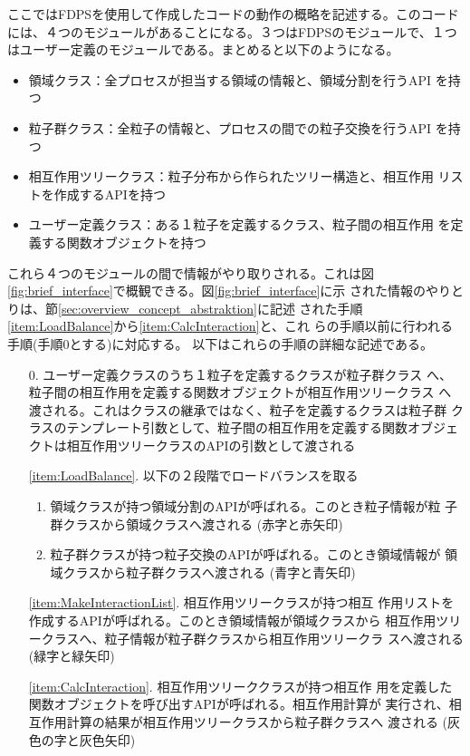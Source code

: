 ここではFDPSを使用して作成したコードの動作の概略を記述する。このコード
には、４つのモジュールがあることになる。３つはFDPSのモジュールで、１つ
はユーザー定義のモジュールである。まとめると以下のようになる。
\begin{itemize}
\item 領域クラス：全プロセスが担当する領域の情報と、領域分割を行うAPI
  を持つ
\item 粒子群クラス：全粒子の情報と、プロセスの間での粒子交換を行うAPI
  を持つ
\item 相互作用ツリークラス：粒子分布から作られたツリー構造と、相互作用
  リストを作成するAPIを持つ
\item ユーザー定義クラス：ある１粒子を定義するクラス、粒子間の相互作用
  を定義する関数オブジェクトを持つ
\end{itemize}

これら４つのモジュールの間で情報がやり取りされる。これは図
\ref{fig:brief_interface}で概観できる。図\ref{fig:brief_interface}に示
された情報のやりとりは、節\ref{sec:overview_concept_abstraktion}に記述
された手順\ref{item:LoadBalance}から\ref{item:CalcInteraction}と、これ
らの手順以前に行われる手順(手順0とする)に対応する。
以下はこれらの手順の詳細な記述である。
\begin{enumerate}
\item[0.] ユーザー定義クラスのうち１粒子を定義するクラスが粒子群クラス
  へ、粒子間の相互作用を定義する関数オブジェクトが相互作用ツリークラス
  へ渡される。これはクラスの継承ではなく、粒子を定義するクラスは粒子群
  クラスのテンプレート引数として、粒子間の相互作用を定義する関数オブジェ
  クトは相互作用ツリークラスのAPIの引数として渡される
\item[\ref{item:LoadBalance}.] 以下の２段階でロードバランスを取る
  \begin{enumerate}
  \item 領域クラスが持つ領域分割のAPIが呼ばれる。このとき粒子情報が粒
    子群クラスから領域クラスへ渡される (赤字と赤矢印)
  \item 粒子群クラスが持つ粒子交換のAPIが呼ばれる。このとき領域情報が
    領域クラスから粒子群クラスへ渡される (青字と青矢印)
  \end{enumerate}
\item[\ref{item:MakeInteractionList}.] 相互作用ツリークラスが持つ相互
  作用リストを作成するAPIが呼ばれる。このとき領域情報が領域クラスから
  相互作用ツリークラスへ、粒子情報が粒子群クラスから相互作用ツリークラ
  スへ渡される (緑字と緑矢印)
\item[\ref{item:CalcInteraction}.] 相互作用ツリーククラスが持つ相互作
  用を定義した関数オブジェクトを呼び出すAPIが呼ばれる。相互作用計算が
  実行され、相互作用計算の結果が相互作用ツリークラスから粒子群クラスへ
  渡される (灰色の字と灰色矢印)
\end{enumerate}

